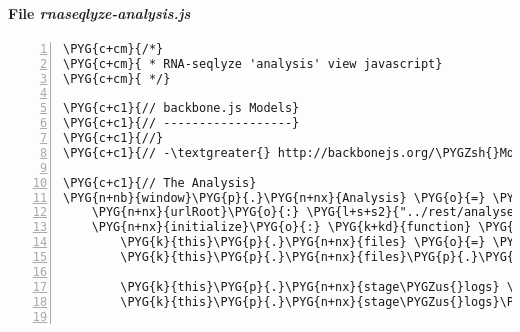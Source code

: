 \paragraph{File \emph{rnaseqlyze-analysis.js}}
\label{rnaseqlyze-pdf:file-rnaseqlyze-analysis-js}
\begin{Verbatim}[commandchars=\\\{\},numbers=left,firstnumber=1,stepnumber=5]
\PYG{c+cm}{/*}
\PYG{c+cm}{ * RNA-seqlyze 'analysis' view javascript}
\PYG{c+cm}{ */}

\PYG{c+c1}{// backbone.js Models}
\PYG{c+c1}{// ------------------}
\PYG{c+c1}{//}
\PYG{c+c1}{// -\textgreater{} http://backbonejs.org/\PYGZsh{}Model}

\PYG{c+c1}{// The Analysis}
\PYG{n+nb}{window}\PYG{p}{.}\PYG{n+nx}{Analysis} \PYG{o}{=} \PYG{n+nx}{Backbone}\PYG{p}{.}\PYG{n+nx}{Model}\PYG{p}{.}\PYG{n+nx}{extend}\PYG{p}{(}\PYG{p}{\PYGZob{}}
    \PYG{n+nx}{urlRoot}\PYG{o}{:} \PYG{l+s+s2}{"../rest/analyses"}\PYG{p}{,}
    \PYG{n+nx}{initialize}\PYG{o}{:} \PYG{k+kd}{function} \PYG{p}{(}\PYG{p}{)} \PYG{p}{\PYGZob{}}
        \PYG{k}{this}\PYG{p}{.}\PYG{n+nx}{files} \PYG{o}{=} \PYG{k}{new} \PYG{n+nx}{DataDirListing}\PYG{p}{(}\PYG{p}{)}\PYG{p}{;}
        \PYG{k}{this}\PYG{p}{.}\PYG{n+nx}{files}\PYG{p}{.}\PYG{n+nx}{analysis} \PYG{o}{=} \PYG{k}{this}\PYG{p}{;}

        \PYG{k}{this}\PYG{p}{.}\PYG{n+nx}{stage\PYGZus{}logs} \PYG{o}{=} \PYG{k}{new} \PYG{n+nx}{StageLogList}\PYG{p}{(}\PYG{p}{)}\PYG{p}{;}
        \PYG{k}{this}\PYG{p}{.}\PYG{n+nx}{stage\PYGZus{}logs}\PYG{p}{.}\PYG{n+nx}{analysis} \PYG{o}{=} \PYG{k}{this}\PYG{p}{;}


\end{Verbatim}

